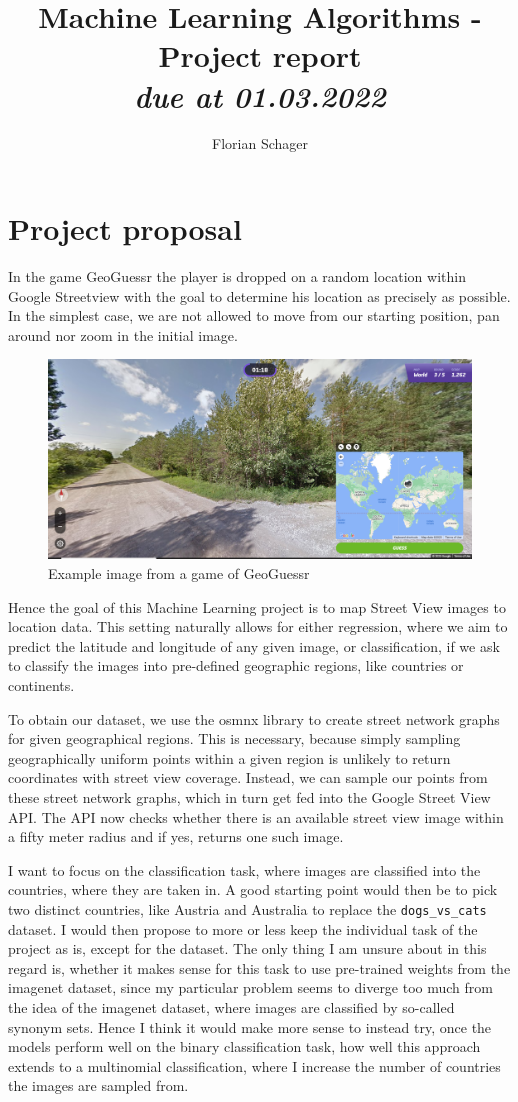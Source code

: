 \documentclass{article}
\title
{
  Machine Learning Algorithms - Project report \\
  \vspace{4pt}
  \normalsize
  \textit{due at 01.03.2022}
}
\author
{
  Florian Schager
}
\date{}
\begin{document}
\maketitle


\section{Project proposal}


In the game GeoGuessr the player is dropped on a random location within Google Streetview
with the goal to determine his location as precisely as possible.
In the simplest case, we are not allowed to move from our starting position,
pan around nor zoom in the initial image.

\begin{figure}[hbt!]
  \centering
    \includegraphics[width = 0.7\linewidth]{example.PNG}
    \caption{Example image from a game of GeoGuessr}
\end{figure}

Hence the goal of this Machine Learning project is to map Street View images to location data.
This setting naturally allows for either regression, where we aim to predict the latitude and longitude of any given image,
or classification, if we ask to classify the images into pre-defined geographic regions, like countries or continents.

To obtain our dataset, we use the osmnx library to create street network graphs for given geographical regions.
This is necessary, because simply sampling geographically uniform points
within a given region is unlikely to return coordinates with street view coverage.
Instead, we can sample our points from these street network graphs, 
which in turn get fed into the Google Street View API.
The API now checks whether there is an available street view image within a fifty meter radius
and if yes, returns one such image.

I want to focus on the classification task, where images are classified into the countries, where they are taken in.
A good starting point would then be to pick two distinct countries, like Austria and Australia
to replace the \texttt{dogs\_vs\_cats} dataset. I would then propose
to more or less keep the individual task of the project as is, except
for the dataset. The only thing I am unsure about in this regard is,
whether it makes sense for this task to use pre-trained weights from
the imagenet dataset, since my particular problem seems to
diverge too much from the idea of the imagenet dataset, where images
are classified by so-called synonym sets.
Hence I think it would make more sense to instead try,
once the models perform well
on the binary classification task, how
well this approach extends to a multinomial classification, where I
increase the number of countries the images are sampled from.
\end{document}
